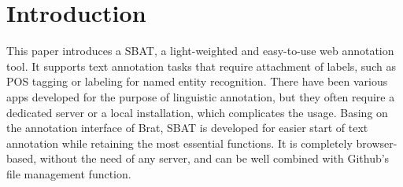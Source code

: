\documentclass[a4paper]{article}
\begin{document}
% 

\newpage
\tableofcontents
\newpage


\section{Introduction}
This paper introduces a SBAT, a light-weighted and easy-to-use web annotation tool. It supports text annotation tasks that require attachment of labels, such as POS tagging or labeling for named entity recognition. There have been various apps developed for the purpose of linguistic annotation, but they often require a dedicated server or a local installation, which complicates the usage. Basing on the annotation interface of Brat, SBAT is developed for easier start of text annotation while retaining the most essential functions. It is completely browser-based, without the need of any server, and can be well combined with Github's file management function.
\end{document}
